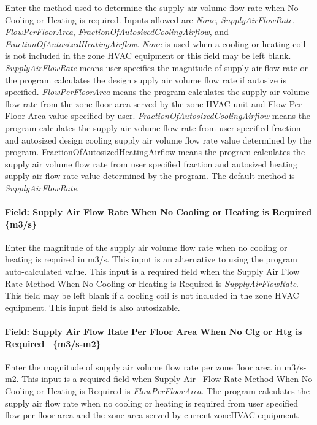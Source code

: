 Enter the method used to determine the supply air volume flow rate when No Cooling or Heating is required. Inputs allowed are \emph{None}, \emph{SupplyAirFlowRate}, \emph{FlowPerFloorArea}, \emph{FractionOfAutosizedCoolingAirflow}, and \emph{FractionOfAutosizedHeatingAirflow.} \emph{None} is used when a cooling or heating coil is not included in the zone HVAC equipment or this field may be left blank. \emph{SupplyAirFlowRate} means user specifies the magnitude of supply air flow rate or the program calculates the design supply air volume flow rate if autosize is specified. \emph{FlowPerFloorArea} means the program calculates the supply air volume flow rate from the zone floor area served by the zone HVAC unit and Flow Per Floor Area value specified by user. \emph{FractionOfAutosizedCoolingAirflow} means the program calculates the supply air volume flow rate from user specified fraction and autosized design cooling supply air volume flow rate value determined by the program. FractionOfAutosizedHeatingAirflow means the program calculates the supply air volume flow rate from user specified fraction and autosized heating supply air flow rate value determined by the program. The default method is \emph{SupplyAirFlowRate}.

\paragraph{Field: Supply Air Flow Rate When No Cooling or Heating is Required \{m3/s\}}\label{field-supply-air-flow-rate-when-no-cooling-or-heating-is-required-m3s}

Enter the magnitude of the supply air volume flow rate when no cooling or heating is required in m3/s. This input is an alternative to using the program auto-calculated value. This input is a required field when the Supply Air Flow Rate Method When No Cooling or Heating is Required is \emph{SupplyAirFlowRate}. This field may be left blank if a cooling coil is not included in the zone HVAC equipment. This input field is also autosizable.

\paragraph{Field: Supply Air Flow Rate Per Floor Area When No Clg or Htg is Required~ \{m3/s-m2\}}\label{field-supply-air-flow-rate-per-floor-area-when-no-clg-or-htg-is-required-m3s-m2}

Enter the magnitude of supply air volume flow rate per zone floor area in m3/s-m2. This input is a required field when Supply Air ~Flow Rate Method When No Cooling or Heating is Required is \emph{FlowPerFloorArea}. The program calculates the supply air flow rate when no cooling or heating is required from user specified flow per floor area and the zone area served by current zoneHVAC equipment.

